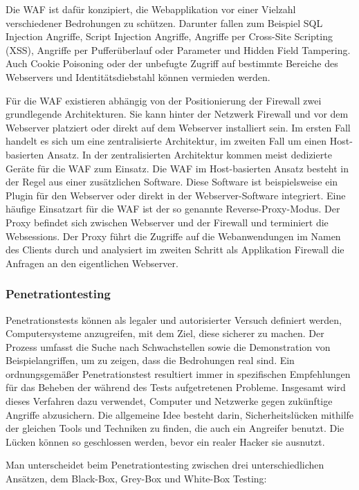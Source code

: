 \documentclass[12pt,oneside,a4paper,parskip]{scrbook}
\begin{document}
    Die WAF ist dafür konzipiert, die Webapplikation vor einer Vielzahl verschiedener Bedrohungen zu schützen. Darunter fallen zum Beispiel SQL Injection Angriffe, Script Injection Angriffe, Angriffe per Cross-Site Scripting (XSS), Angriffe per Pufferüberlauf oder Parameter und Hidden Field Tampering. Auch Cookie Poisoning oder der unbefugte Zugriff auf bestimmte Bereiche des Webservers und Identitätsdiebstahl können vermieden werden.

    Für die WAF existieren abhängig von der Positionierung der Firewall zwei grundlegende Architekturen. Sie kann hinter der Netzwerk Firewall und vor dem Webserver platziert oder direkt auf dem Webserver installiert sein. Im ersten Fall handelt es sich um eine zentralisierte Architektur, im zweiten Fall um einen Host-basierten Ansatz. In der zentralisierten Architektur kommen meist dedizierte Geräte für die WAF zum Einsatz. Die WAF im Host-basierten Ansatz besteht in der Regel aus einer zusätzlichen Software. Diese Software ist beispielsweise ein Plugin für den Webserver oder direkt in der Webserver-Software integriert. Eine häufige Einsatzart für die WAF ist der so genannte Reverse-Proxy-Modus. Der Proxy befindet sich zwischen Webserver und der Firewall und terminiert die Websessions. Der Proxy führt die Zugriffe auf die Webanwendungen im Namen des Clients durch und analysiert im zweiten Schritt als Applikation Firewall die Anfragen an den eigentlichen Webserver. \cite{WAF}

    \subsubsection{Penetrationtesting}
    Penetrationstests können als legaler und autorisierter Versuch definiert werden, Computersysteme anzugreifen, mit dem Ziel, diese sicherer zu machen.
    Der Prozess umfasst die Suche nach Schwachstellen sowie die Demonstration von Beispielangriffen, um zu zeigen, dass die Bedrohungen real sind.
    Ein ordnungsgemäßer Penetrationstest resultiert immer in spezifischen Empfehlungen für das
    Beheben der während des Tests aufgetretenen Probleme.
    Insgesamt wird dieses Verfahren dazu verwendet, Computer und Netzwerke gegen zukünftige Angriffe abzusichern. Die allgemeine Idee besteht darin, Sicherheitslücken mithilfe der gleichen Tools und Techniken zu finden, die auch ein Angreifer benutzt. Die Lücken können so geschlossen werden, bevor ein realer Hacker sie ausnutzt. \cite{engebretson}

    Man unterscheidet beim Penetrationtesting zwischen drei unterschiedlichen Ansätzen, dem Black-Box, Grey-Box und White-Box Testing:
\end{document}
